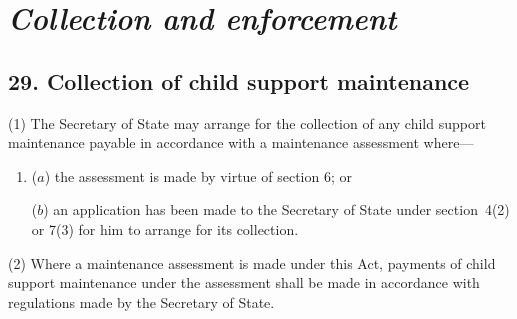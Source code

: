 \documentclass[12pt,a4paper]{article}
\begin{document}


\section{\itshape Collection and enforcement}

\subsection{29. Collection of child support maintenance}

(1) The Secretary of State may arrange for the collection of any child support maintenance payable in accordance with a maintenance assessment where—
\begin{enumerate}\item[]
($a$) the assessment is made by virtue of section 6; or

($b$) an application has been made to the Secretary of State under section~4(2)  or 7(3)  for him to arrange for its collection.
\end{enumerate}

(2) Where a maintenance assessment is made under this Act, payments of child support maintenance under the assessment shall be made in accordance with regulations made by the Secretary of State.
\end{document}
